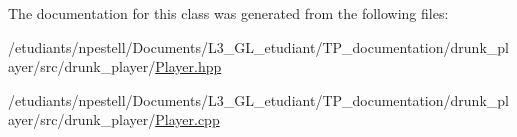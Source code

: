 The documentation for this class was generated from the following files\+:\begin{DoxyCompactItemize}
\item 
/etudiants/npestell/\+Documents/\+L3\+\_\+\+G\+L\+\_\+etudiant/\+T\+P\+\_\+documentation/drunk\+\_\+player/src/drunk\+\_\+player/\hyperlink{Player_8hpp}{Player.\+hpp}\item 
/etudiants/npestell/\+Documents/\+L3\+\_\+\+G\+L\+\_\+etudiant/\+T\+P\+\_\+documentation/drunk\+\_\+player/src/drunk\+\_\+player/\hyperlink{Player_8cpp}{Player.\+cpp}\end{DoxyCompactItemize}
